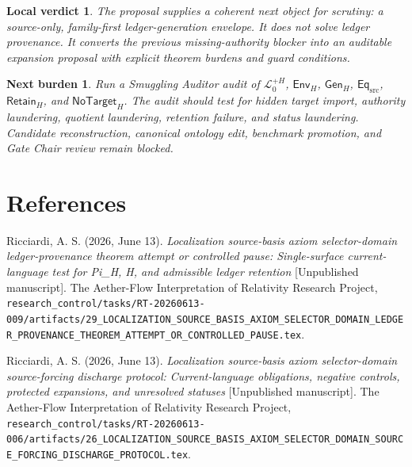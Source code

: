 \documentclass[11pt]{article}
\newcommand{\LangPlus}{\mathcal{L}_{0}^{+H}}
\newcommand{\GenH}{\mathsf{Gen}_{H}}
\newcommand{\EnvH}{\mathsf{Env}_{H}}
\newcommand{\EqSrc}{\mathsf{Eq}_{\mathrm{src}}}
\newcommand{\Retain}{\mathsf{Retain}}
\newcommand{\NoTarget}{\mathsf{NoTarget}}
\newtheorem{verdict}{Local verdict}
\newtheorem{nextburden}{Next burden}
\begin{document}
\begin{verdict}
The proposal supplies a coherent next object for scrutiny: a source-only,
family-first ledger-generation envelope. It does not solve ledger
provenance. It converts the previous missing-authority blocker into an
auditable expansion proposal with explicit theorem burdens and guard
conditions.
\end{verdict}

\begin{nextburden}
Run a Smuggling Auditor audit of \(\LangPlus\), \(\EnvH\), \(\GenH\),
\(\EqSrc\), \(\Retain_H\), and \(\NoTarget_H\). The audit should test for
hidden target import, authority laundering, quotient laundering, retention
failure, and status laundering. Candidate reconstruction, canonical
ontology edit, benchmark promotion, and Gate Chair review remain blocked.
\end{nextburden}

\section{References}

Ricciardi, A. S. (2026, June 13). \emph{Localization source-basis axiom
selector-domain ledger-provenance theorem attempt or controlled pause:
Single-surface current-language test for Pi\_H, H, and admissible ledger
retention} [Unpublished manuscript]. The Aether-Flow Interpretation of
Relativity Research Project,
\texttt{research\_control/tasks/RT-20260613-009/artifacts/29\_LOCALIZATION\_SOURCE\_BASIS\_AXIOM\_SELECTOR\_DOMAIN\_LEDGER\_PROVENANCE\_THEOREM\_ATTEMPT\_OR\_CONTROLLED\_PAUSE.tex}.

Ricciardi, A. S. (2026, June 13). \emph{Localization source-basis axiom
selector-domain source-forcing discharge protocol: Current-language
obligations, negative controls, protected expansions, and unresolved
statuses} [Unpublished manuscript]. The Aether-Flow Interpretation of
Relativity Research Project,
\texttt{research\_control/tasks/RT-20260613-006/artifacts/26\_LOCALIZATION\_SOURCE\_BASIS\_AXIOM\_SELECTOR\_DOMAIN\_SOURCE\_FORCING\_DISCHARGE\_PROTOCOL.tex}.
\end{document}
